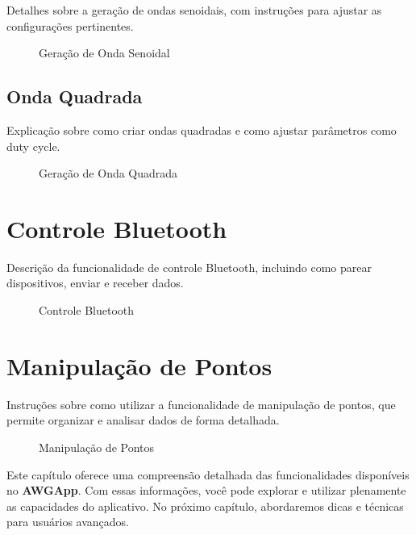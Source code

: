 \documentclass[12pt,a4paper]{book}
\newcommand{\nomesoftware}{AWGApp}
\begin{document}
Detalhes sobre a geração de ondas senoidais, com instruções para ajustar as configurações pertinentes.

\begin{figure}[h]
\centering
\caption{Geração de Onda Senoidal}
\end{figure}

\subsection{Onda Quadrada}

Explicação sobre como criar ondas quadradas e como ajustar parâmetros como duty cycle.

\begin{figure}[h]
\centering
\caption{Geração de Onda Quadrada}
\end{figure}

\section{Controle Bluetooth}

Descrição da funcionalidade de controle Bluetooth, incluindo como parear dispositivos, enviar e receber dados.

\begin{figure}[h]
\centering
\caption{Controle Bluetooth}
\end{figure}

\section{Manipulação de Pontos}

Instruções sobre como utilizar a funcionalidade de manipulação de pontos, que permite organizar e analisar dados de forma detalhada.

\begin{figure}[h]
\centering
\caption{Manipulação de Pontos}
\end{figure}

Este capítulo oferece uma compreensão detalhada das funcionalidades disponíveis no \textbf{\nomesoftware{}}. Com essas informações, você pode explorar e utilizar plenamente as capacidades do aplicativo. No próximo capítulo, abordaremos dicas e técnicas para usuários avançados.
\end{document}
